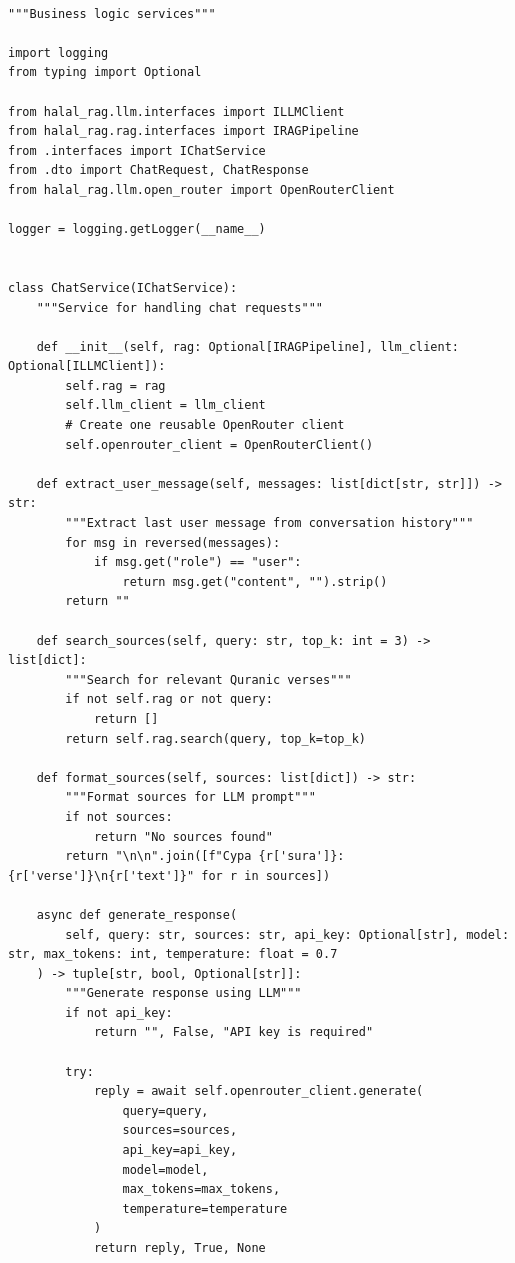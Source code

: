 \begin{lstlisting}[basicstyle=\tiny\ttfamily,breaklines=true]

"""Business logic services"""

import logging
from typing import Optional

from halal_rag.llm.interfaces import ILLMClient
from halal_rag.rag.interfaces import IRAGPipeline
from .interfaces import IChatService
from .dto import ChatRequest, ChatResponse
from halal_rag.llm.open_router import OpenRouterClient

logger = logging.getLogger(__name__)


class ChatService(IChatService):
    """Service for handling chat requests"""

    def __init__(self, rag: Optional[IRAGPipeline], llm_client: Optional[ILLMClient]):
        self.rag = rag
        self.llm_client = llm_client
        # Create one reusable OpenRouter client
        self.openrouter_client = OpenRouterClient()

    def extract_user_message(self, messages: list[dict[str, str]]) -> str:
        """Extract last user message from conversation history"""
        for msg in reversed(messages):
            if msg.get("role") == "user":
                return msg.get("content", "").strip()
        return ""

    def search_sources(self, query: str, top_k: int = 3) -> list[dict]:
        """Search for relevant Quranic verses"""
        if not self.rag or not query:
            return []
        return self.rag.search(query, top_k=top_k)

    def format_sources(self, sources: list[dict]) -> str:
        """Format sources for LLM prompt"""
        if not sources:
            return "No sources found"
        return "\n\n".join([f"Сура {r['sura']}:{r['verse']}\n{r['text']}" for r in sources])

    async def generate_response(
        self, query: str, sources: str, api_key: Optional[str], model: str, max_tokens: int, temperature: float = 0.7
    ) -> tuple[str, bool, Optional[str]]:
        """Generate response using LLM"""
        if not api_key:
            return "", False, "API key is required"

        try:
            reply = await self.openrouter_client.generate(
                query=query,
                sources=sources,
                api_key=api_key,
                model=model,
                max_tokens=max_tokens,
                temperature=temperature
            )
            return reply, True, None


\end{lstlisting}
